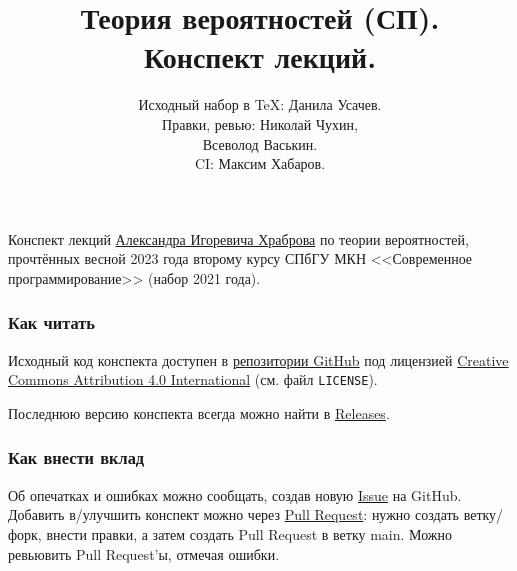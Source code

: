 \documentclass[a4paper,14pt]{extarticle}
\title{Теория вероятностей (СП). \\
  Конспект лекций.}
\author{
 Исходный набор в \TeX: Данила Усачев. \\
 Правки, ревью: Николай Чухин, \\
 Всеволод Васькин. \\
 CI: Максим Хабаров.
}
\date{}
\theoremstyle{definition}
\theoremstyle{plain}
\theoremstyle{plain}
\theoremstyle{plain}
\theoremstyle{plain}
\theoremstyle{definition}
\theoremstyle{definition}
\theoremstyle{definition}
\theoremstyle{definition}
\theoremstyle{definition}
\theoremstyle{definition}
\theoremstyle{definition}
\theoremstyle{definition}
\theoremstyle{definition}
\theoremstyle{definition}
\theoremstyle{definition}
\theoremstyle{plain}
\theoremstyle{plain}
\theoremstyle{plain}
\theoremstyle{plain}
\theoremstyle{definition}
\theoremstyle{definition}
\theoremstyle{definition}
\theoremstyle{definition}
\theoremstyle{definition}
\theoremstyle{definition}
\begin{document}
\maketitle
Конспект лекций \href{https://math-cs.spbu.ru/people/hrabrov-aleksandr-igorevich/}{\color{blue}Александра Игоревича Храброва} по теории вероятностей, прочтённых весной 2023 года второму курсу СПбГУ МКН <<Современное программирование>> (набор 2021 года).

\subsubsection*{Как читать}
Исходный код конспекта доступен в  \href{https://github.com/koreshaSp/probability_theory}{\color{blue}репозитории GitHub} под лицензией \href{https://creativecommons.org/licenses/by/4.0/}{\color{blue}Creative Commons Attribution 4.0 International} (см. файл \texttt{LICENSE}).

Последнюю версию конспекта всегда можно найти в \href{https://github.com/koreshaSp/probability_theory/releases}{\color{blue}Releases}.

\subsubsection*{Как внести вклад}
Об опечатках и ошибках можно сообщать, создав новую \href{https://github.com/koreshaSp/probability_theory/issues}{\color{blue}Issue} на GitHub.
Добавить в/улучшить конспект можно через \href{https://github.com/koreshaSp/probability_theory/pulls}{\color{blue}Pull Request}: нужно создать ветку/форк, внести правки, а затем создать Pull Request в ветку main.
Можно ревьювить Pull Request'ы, отмечая ошибки.

\newpage
\tableofcontents
\newpage














\end{document}
